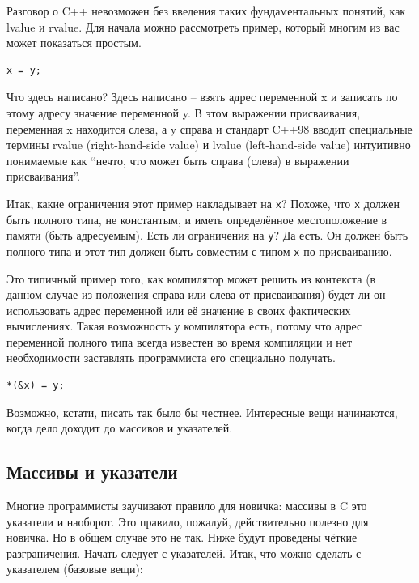 \documentclass[a4paper,12pt,oneside]{article}
\begin{document}
Разговор о C++ невозможен без введения таких фундаментальных понятий, как lvalue и rvalue. Для начала можно рассмотреть пример, который многим из вас может показаться простым.

\begin{lstlisting}
x = y;
\end{lstlisting}

Что здесь написано? Здесь написано – взять адрес переменной x и записать по этому адресу значение переменной y. В этом выражении присваивания, переменная x находится слева, а y справа и стандарт C++98 вводит специальные термины rvalue (right-hand-side value) и lvalue (left-hand-side value) интуитивно понимаемые как ``нечто, что может быть справа (слева) в выражении присваивания''. 

Итак, какие ограничения этот пример накладывает на \lstinline!x!? Похоже, что \lstinline!x! должен быть полного типа, не константым, и иметь определённое местоположение в памяти (быть адресуемым). Есть ли ограничения на \lstinline!y!? Да есть. Он должен быть полного типа и этот тип должен быть совместим с типом \lstinline!x! по присваиванию.  

Это типичный пример того, как компилятор может решить из контекста (в данном случае из положения справа или слева от присваивания) будет ли он использовать адрес переменной или её значение в своих фактических вычислениях. Такая возможность у компилятора есть, потому что адрес переменной полного типа всегда известен во время компиляции и нет необходимости заставлять программиста его специально получать.

\begin{lstlisting}
*(&x) = y;
\end{lstlisting}

Возможно, кстати, писать так было бы честнее. Интересные вещи начинаются, когда дело доходит до массивов и указателей.

\pagebreak
\subsection{Массивы и указатели}\label{ArrPointers}

Многие программисты заучивают правило для новичка: массивы в C это указатели и наоборот. Это правило, пожалуй, действительно полезно для новичка. Но в общем случае это не так. Ниже будут проведены чёткие разграничения. Начать следует с указателей. Итак, что можно сделать с указателем (базовые вещи):
\end{document}

